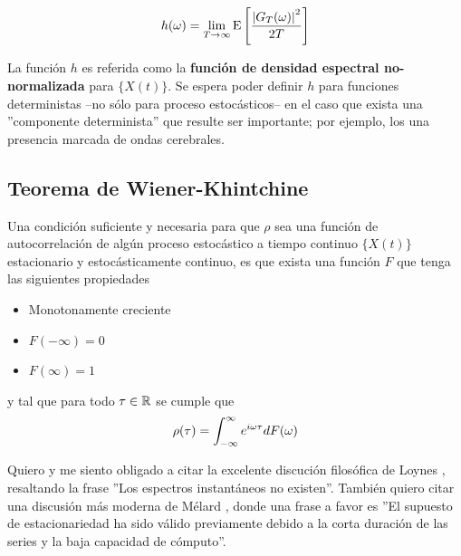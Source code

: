 \begin{equation}
h(\omega) = \lim_{T\rightarrow \infty} \mathrm{E}\left[  \frac{ \left| G_T(\omega) \right|^{2}}{2 T}  \right]
\end{equation}

La funci\'on $h$ es referida como la \textbf{funci\'on de densidad espectral no-normalizada} para
$\{X(t)\}$. 
Se espera poder definir $h$ para funciones deterministas --no sólo para proceso estoc\'asticos--
en el caso que exista una ''componente determinista'' que resulte ser importante; por ejemplo, los
una presencia marcada de ondas cerebrales.

\subsection{Teorema de Wiener-Khintchine}

\begin{thrm}
Una condici\'on suficiente y necesaria para que $\rho$ sea una funci\'on de autocorrelaci\'on de 
alg\'un proceso estoc\'astico a tiempo continuo $\{X(t)\}$ estacionario y estoc\'asticamente 
continuo, es que exista una funci\'on $F$ que tenga las 
siguientes propiedades
\begin{itemize}
\item Monotonamente creciente
\item $F(-\infty) = 0$
\item $F(\infty) = 1$
\end{itemize}
y tal que para todo $\tau \in \mathbb{R}$ se cumple que
\begin{equation*}
\rho(\tau) = \int_{-\infty}^{\infty} e^{i \omega \tau} dF(\omega)
\end{equation*}
\end{thrm}


%


Quiero y me siento obligado a citar la excelente discuci\'on
filos\'ofica
de Loynes \cite{Loynes68}, resaltando la frase ''Los espectros instant\'aneos no existen''.
Tambi\'en quiero citar una discusi\'on m\'as moderna de M\'elard \cite{Melard89}, donde una
frase a favor es ''El supuesto de estacionariedad ha sido v\'alido previamente debido a la corta
duraci\'on de las series y la baja capacidad de c\'omputo''.

